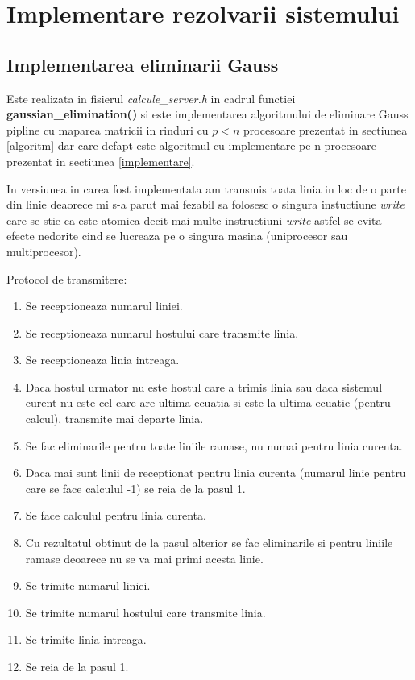 \chapter{Implementare rezolvarii sistemului}
\section{Implementarea eliminarii Gauss}

\hspace{5mm}Este realizata in fisierul {\it calcule\_server.h} in cadrul
functiei {\bf gaussian\_elimination()} si este implementarea algoritmului de
eliminare Gauss pipline cu maparea matricii in rinduri cu $p<n$ procesoare
prezentat in sectiunea \ref{algoritm} dar care defapt este algoritmul
cu implementare pe n procesoare prezentat in sectiunea \ref{implementare}.

In versiunea in carea fost implementata am transmis toata linia in loc de o
parte din linie deaorece mi s-a parut mai fezabil sa folosesc o singura
instuctiune {\it write} care se stie ca este atomica decit mai multe
instructiuni {\it write} astfel se evita efecte nedorite cind se lucreaza pe
o singura masina (uniprocesor sau multiprocesor).

Protocol de transmitere:
\begin{enumerate}
\item Se receptioneaza numarul liniei.
\item Se receptioneaza numarul hostului care transmite linia.
\item Se receptioneaza linia intreaga.
\item Daca hostul urmator nu este hostul care a trimis linia sau daca
sistemul curent nu este cel care are ultima ecuatia si este la ultima
ecuatie (pentru calcul), transmite mai departe linia.
\item Se fac eliminarile pentru toate liniile ramase, nu numai pentru linia
curenta.
\item Daca mai sunt linii de receptionat pentru linia curenta (numarul linie
pentru care se face calculul -1) se reia de la pasul 1.
\item Se face calculul pentru linia curenta.
\item Cu rezultatul obtinut de la pasul alterior se fac eliminarile si
pentru liniile ramase deoarece nu se va mai primi acesta linie.
\item Se trimite numarul liniei.
\item Se trimite numarul hostului care transmite linia.
\item Se trimite linia intreaga.
\item Se reia de la pasul 1.
\end{enumerate}

